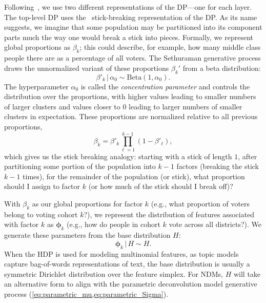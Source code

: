 \documentclass[twoside,11pt]{article}
\newcommand{\g}{\, | \,}
\begin{document}
Following~\citet{Paisley:2012}, we use two different representations of the DP---one for each layer. The top-level DP uses the~\citet{Sethuraman:1994} stick-breaking representation of the DP.  As its name suggests, we imagine that some population may be partitioned into its component parts much the way one would break a stick into pieces.  Formally, we represent global proportions as $\beta_k$; this could describe, for example, how many middle class people there are as a percentage of all voters.  The Sethuraman generative process draws the unnormalized variant of these proportions $\beta_k'$ from a beta distribution:
\begin{equation}
\beta'_k \g \alpha_0 \sim \mbox{Beta}(1,\alpha_0). 
\label{eq:unormalizedBeta}
\end{equation}
The hyperparameter $\alpha_0$ is called the \emph{concentration parameter} and controls the distribution over the proportions, with higher values leading to smaller numbers of larger clusters and values closer to $0$ leading to larger numbers of smaller clusters in expectation.
These proportions are normalized relative to all previous proportions,
\begin{equation}
\beta_k = \beta'_k \prod_{\ell=1}^{k-1} \left(1-\beta'_{\ell}\right), \label{eq:normalizedBeta}
\end{equation}
which gives us the stick breaking analogy: starting with a stick of length $1$, after partitioning some portion of the population into $k-1$ factors (breaking the stick $k-1$ times), for the remainder of the population (or stick), what proportion should I assign to factor $k$ (or how much of the stick should I break off)?

With $\beta_k$ as our global proportions for factor $k$ (e.g., what proportion of voters belong to voting cohort $k$?), we represent the distribution of features associated with factor $k$ as $\boldsymbol{\phi}_k$ (e.g., how do people in cohort $k$ vote across all districts?).  We generate these parameters from the base distribution $H$:
\begin{equation}
\boldsymbol{\phi}_k \g H \sim H.
\label{eq:phi}
\end{equation}
When the HDP is used for modeling multinomial features, as topic models capture bag-of-words representations of text, the base distribution is usually a symmetric Dirichlet distribution over the feature simplex.  For NDMs, $H$ will take an alternative form to align with the parametric deconvolution model generative process (\cref{eq:parametric_mu,eq:parametric_Sigma}).
\end{document}
